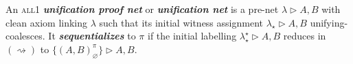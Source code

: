 \documentclass[UKenglish]{lipics-v2016}
\theoremstyle{plain}
\newcommand\defn[1]{\textit{\textbf{#1}}}
\newcommand\all{\textsc{all}}
\newcommand\+{+}
\renewcommand\*{\times}
\newcommand\net[3]{#1\triangleright #2,#3}
\newcommand\link[3][\sigma]{(#2,#3)_{#1}}
\newcommand\scoal{\rightarrow} %
\newcommand\ucoal{\rightsquigarrow}
\begin{document}





\begin{definition}
An \all1 \defn{unification proof net} or \defn{unification net} is a pre-net $\net\lambda AB$ with clean axiom linking $\lambda$ such that its initial witness assignment $\net{\lambda_\star}AB$ unifying-coalesces. It \defn{sequentializes} to $\pi$ if the initial labelling $\net{\lambda^\star_\star}AB$ reduces in $(\ucoal)$ to $\net{\{\link[\varnothing]AB^\pi\}}AB$.
\end{definition}
\end{document}
